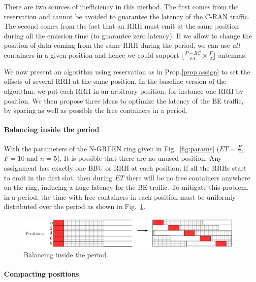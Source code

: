 \documentclass[10pt, conference, letterpaper]{IEEEtran}
\begin{document}
There are two sources of inefficiency in this method. The first comes from the reservation and cannot be avoided to guarantee the latency of the C-RAN traffic. The second comes from the fact that an RRH must emit at the same position during all the emission time (to guarantee zero latency). If we allow to change the position of data coming from the same RRH during the period, 
we can use \emph{all} containers in a given position and hence we could support $\lfloor\frac{P- RS}{ET} \times \frac{F}{2}\rfloor$ antennas.


We now present an algorithm using reservation as in Prop.\ref{prop:assign} to set the offsets of several RRH at the same position. In the baseline version of the algorithm, we put each RRH in an arbitrary position, for instance one RRH by position. We then propose three ideas to optimize the latency of the BE traffic, by spacing as well as possible the free containers in a period.

\paragraph{Balancing inside the period}

With the parameters of the N-GREEN ring given in Fig.~\ref{fig:params} ($ET = \frac{P}{2}$, $F = 10$ and $n = 5$), It is possible that there are no unused position. Any assignment has exactly one  BBU or RRH at each position. If all the RRHs start to emit in the first slot, then during $ET$ there will be no free containers anywhere on the ring, inducing a huge latency for the BE traffic. 
To mitigate this problem, in a period, the time with free containers in each position must be uniformly distributed over the period as shown in Fig.~\ref{fig:periodbal}.
\begin{figure}[h!]
\begin{center}   

      \includegraphics[scale=0.55]{repart2}
     \caption{Balancing inside the period.}\label{fig:periodbal}
     
\end{center}
  \end{figure}  
  

  
\paragraph{Compacting positions}
\end{document}
